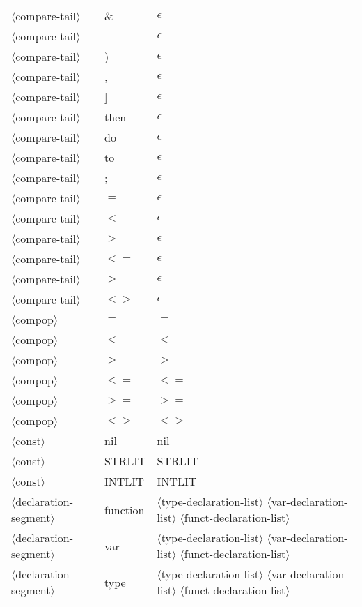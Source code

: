 \documentclass[11pt, fleqn]{article}
\newcommand{\atag}[1]{$\langle$#1$\rangle$}
\begin{document}
\begin{longtable}{l|l|l}
\atag{compare-tail}				&	\&			&	$\epsilon$					\\
\atag{compare-tail}				&	\textbar			&	$\epsilon$					\\
\atag{compare-tail}				&	)			&	$\epsilon$					\\
\atag{compare-tail}				&	,			&	$\epsilon$					\\
\atag{compare-tail}				&	]			&	$\epsilon$					\\
\atag{compare-tail}				&	then			&	$\epsilon$					\\
\atag{compare-tail}				&	do			&	$\epsilon$					\\
\atag{compare-tail}				&	to			&	$\epsilon$					\\
\atag{compare-tail}				&	;			&	$\epsilon$					\\
\atag{compare-tail}				&	$=$			&	$\epsilon$					\\
\atag{compare-tail}				&	$<$			&	$\epsilon$					\\
\atag{compare-tail}				&	$>$			&	$\epsilon$					\\
\atag{compare-tail}				&	$<=$			&	$\epsilon$					\\
\atag{compare-tail}				&	$>=$			&	$\epsilon$					\\
\atag{compare-tail}				&	$<>$			&	$\epsilon$						\\
\atag{compop}					&	$=$			&	$=$								\\
\atag{compop}					&	$<$			&	$<$								\\
\atag{compop}					&	$>$			&	$>$								\\
\atag{compop}					&	$<=$			&	$<=$								\\
\atag{compop}					&	$>=$			&	$>=$								\\
\atag{compop}					&	$<>$			&	$<>$								\\
\atag{const}						&	nil			&	nil	\\
\atag{const}						&	STRLIT		&	STRLIT	\\
\atag{const}						&	INTLIT		&	INTLIT	\\
\atag{declaration-segment}		&	function		&	\atag{type-declaration-list}	\atag{var-declaration-list} \atag{funct-declaration-list}	\\
\atag{declaration-segment}		&	var			&	\atag{type-declaration-list}	\atag{var-declaration-list} \atag{funct-declaration-list}	\\
\atag{declaration-segment}		&	type			&	\atag{type-declaration-list}	\atag{var-declaration-list} \atag{funct-declaration-list}	\\

\end{longtable}
\end{document}
